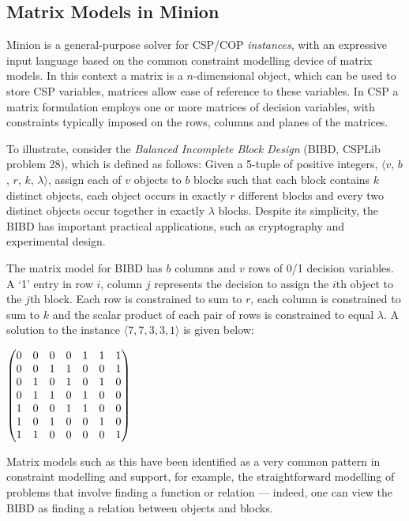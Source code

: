 \documentclass{article}
\begin{document}
\begin{small}
\section{Matrix Models in {\sc Minion}}\label{sect_matrix}

{\sc Minion} is a general-purpose solver for CSP/COP {\em instances},
with an expressive input language based on the common constraint
modelling device of matrix models. In this context a matrix is a
$n$-dimensional object, which can be used to store CSP variables,
matrices allow ease of reference to these variables. In CSP a matrix
formulation employs one or more matrices of decision variables, with
constraints typically imposed on the rows, columns and planes of the
matrices.

To illustrate, consider the {\em Balanced Incomplete Block Design}
(BIBD, CSPLib problem 28), which is defined as follows: Given a
5-tuple of positive integers, $\langle v$, $b$, $r$, $k$,
$\lambda\rangle$, assign each of $v$ objects to $b$ blocks such that
each block contains $k$ distinct objects, each object occurs in
exactly $r$ different blocks and every two distinct objects occur
together in exactly $\lambda$ blocks. Despite its simplicity, the BIBD
has important practical applications, such as cryptography and
experimental design.

The matrix model for BIBD has $b$ columns and $v$ rows of 0/1 decision
variables. A `1' entry in row $i$, column $j$ represents the decision
to assign the $i$th object to the $j$th block. Each row is constrained
to sum to $r$, each column is constrained to sum to $k$ and the scalar
product of each pair of rows is constrained to equal $\lambda$. A
solution to the instance $\langle 7, 7, 3, 3, 1\rangle$ is given
below:

$\begin{pmatrix}0&0&0&0&1&1&1\cr
         0&0&1&1&0&0&1\cr
         0&1&0&1&0&1&0\cr
         0&1&1&0&1&0&0\cr
         1&0&0&1&1&0&0\cr
         1&0&1&0&0&1&0\cr
         1&1&0&0&0&0&1\end{pmatrix}$

Matrix models such as this have been identified as a very common
pattern in constraint modelling and support, for example, the
straightforward modelling of problems that involve finding a function
or relation --- indeed, one can view the BIBD as finding a relation
between objects and blocks.


\end{small}
\end{document}

